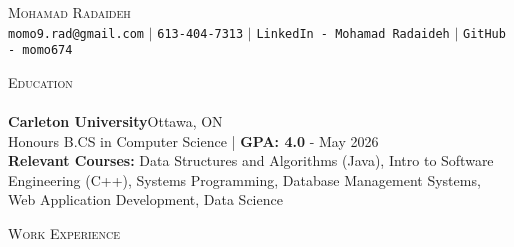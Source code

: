 \documentclass[a4paper]{article}
\newcommand{\lineunder} {
    \vspace*{-8pt} \\
    \hspace*{-18pt} \hrulefill \\
}
\newcommand{\header} [1] {
    {\hspace*{-18pt}\vspace*{6pt} \textsc{#1}}
    \vspace*{-6pt} \lineunder
}
\newcommand{\courses} [1] {
    \textbf{Relevant Courses:} #1 \\
}
\begin{document}
\vspace*{-40pt}

\vspace*{-10pt}
\begin{center}
    {\Huge \scshape {Mohamad Radaideh}}\\
    \texttt{momo9.rad@gmail.com} $\vert$ \texttt{613-404-7313} $\vert$ \texttt{LinkedIn - Mohamad Radaideh} $\vert$ \texttt{GitHub - momo674}
\end{center}

\header{Education}
\textbf{Carleton University}\hfill Ottawa, ON\\
Honours B.CS in Computer Science | \textbf{GPA: 4.0} \hfill  - May 2026\\
\courses{Data Structures and Algorithms (Java), Intro to Software Engineering (C++), Systems Programming, Database Management Systems, Web Application Development, Data Science}
\vspace{2mm}

\header{Work Experience}
\vspace{1mm}
\end{document}
